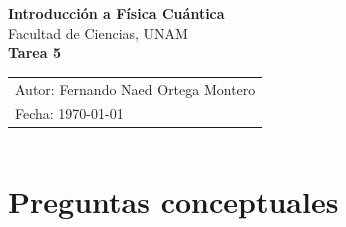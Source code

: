 \documentclass[12pt,a4paper]{article}
\begin{document}
\begin{center}
    {\LARGE \textbf{Introducción a Física Cuántica}} \\[0.4cm]

    {\large Facultad de Ciencias, UNAM} \\[0.6cm]

    \large \textbf{Tarea 5} \\[0.2cm]

    \begin{tabular}{l}
        \small Autor: Fernando Naed Ortega Montero\\
        \small Fecha: \today
    \end{tabular}
\end{center}
\[\] %


\section*{Preguntas conceptuales}
\end{document}
